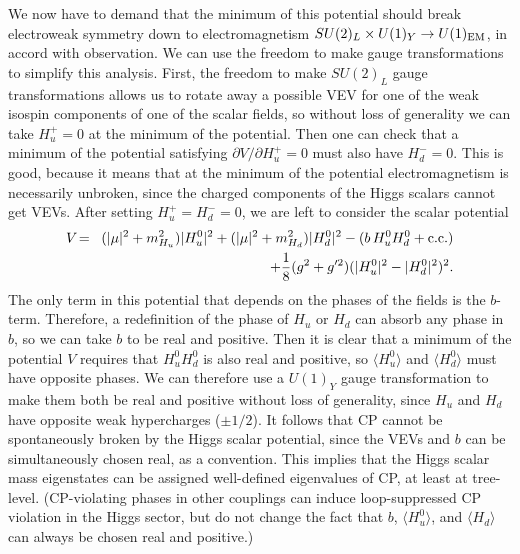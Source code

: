 \documentclass[11pt]{article}
\def\beq{\begin{eqnarray}}
\def\eeq{\end{eqnarray}}
\def\conj{{{\rm c.c.}}}
\begin{document}
We now have to demand that the minimum of this potential should break 
electroweak symmetry down to electromagnetism $SU(2)_L\times U(1)_Y 
\rightarrow U(1)_{\rm EM}$, in accord with observation. We can use the 
freedom to make gauge transformations to simplify this analysis. First, 
the freedom to make $SU(2)_L$ gauge transformations allows us to rotate 
away a possible VEV for one of the weak isospin components of one of the 
scalar fields, so without loss of generality we can take $H_u^+=0$ at the 
minimum of the potential. Then one can check that a minimum of the potential 
satisfying $\partial V/\partial H_u^+=0$ must also have $H_d^- = 0$. This 
is good, because it means that at the minimum of the potential 
electromagnetism is necessarily unbroken, since the charged components of 
the Higgs scalars cannot get VEVs. After setting $H_u^+=H_d^-=0$, we are 
left to consider the scalar potential
\beq
V \!&=&\!
(|\mu|^2 + m^2_{H_u}) |H_u^0|^2 + (|\mu|^2 + m^2_{H_d}) |H_d^0|^2
- (b\, H_u^0 H_d^0 + \conj)
\nonumber \\ && 
+ {1\over 8} (g^2 + g^{\prime 2}) ( |H_u^0|^2 - |H_d^0|^2 )^2 .
\label{littlehiggsv}
\eeq
The only term in this potential that depends on the phases of the fields 
is the $b$-term. Therefore, a redefinition of the phase of $H_u$ or $H_d$ 
can absorb any phase in $b$, so we can take $b$ to be real and positive. 
Then it is clear that a minimum of the potential $V$ requires that $H_u^0 
H_d^0$ is also real and positive, so $\langle H_u^0\rangle$ and $\langle 
H_d^0\rangle$ must have opposite phases. We can therefore use a $U(1)_Y$ 
gauge transformation to make them both be real and positive without loss 
of generality, since $H_u$ and $H_d$ have opposite weak hypercharges ($\pm 
1/2$). It follows that CP cannot be spontaneously broken by the Higgs 
scalar potential, since the VEVs and $b$ can be simultaneously chosen 
real, as a convention. This implies that the Higgs scalar mass eigenstates 
can be assigned well-defined eigenvalues of CP, at least at tree-level. 
(CP-violating phases in other couplings can induce loop-suppressed CP 
violation in the Higgs sector, but do not change the fact that $b$, 
$\langle H_u^0 \rangle$, 
and $\langle H_d \rangle$ can always be chosen real and positive.)
\end{document}
